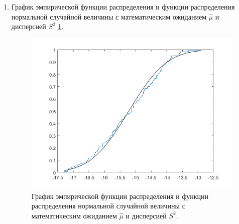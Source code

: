 \documentclass[a4paper,oneside,12pt]{extreport}
\theoremstyle{indented}
\begin{document}
\begin{enumerate}
\item График эмпирической функции распределения и функции распределения нормальной случайной величины с математическим ожиданием $\hat \mu$ и дисперсией $S^2$ \ref{img:outputGraph2}. 

\begin{figure}[H]
\begin{center}
\includegraphics[scale=0.28]{inc/img/outputGraph2.png}
\captionsetup{justification=centering}
	\caption{График эмпирической функции распределения и функции распределения нормальной случайной величины с математическим ожиданием $\hat \mu$ и дисперсией $S^2$.}
	\label{img:outputGraph2}	
\end{center}
\end{figure}

\end{enumerate}
\end{document}
